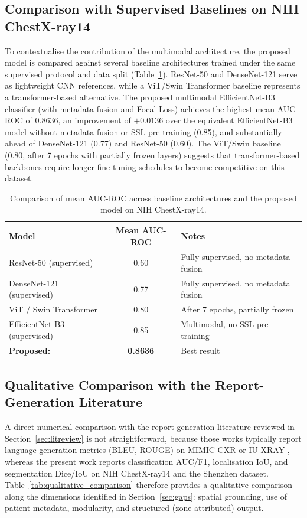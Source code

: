 \documentclass[preprint,12pt,authoryear]{elsarticle}
\begin{document}
\subsection{Comparison with Supervised Baselines on NIH ChestX-ray14}

To contextualise the contribution of the multimodal architecture, the proposed model is compared against several baseline architectures trained under the same supervised protocol and data split (Table~\ref{tab:baselines}). ResNet-50 and DenseNet-121 serve as lightweight CNN references, while a ViT/Swin Transformer baseline represents a transformer-based alternative. The proposed multimodal EfficientNet-B3 classifier (with metadata fusion and Focal Loss) achieves the highest mean AUC-ROC of 0.8636, an improvement of $+0.0136$ over the equivalent EfficientNet-B3 model without metadata fusion or SSL pre-training (0.85), and substantially ahead of DenseNet-121 (0.77) and ResNet-50 (0.60). The ViT/Swin baseline (0.80, after 7 epochs with partially frozen layers) suggests that transformer-based backbones require longer fine-tuning schedules to become competitive on this dataset.
\FloatBarrier
\begin{table}[ht]
\centering
\caption{Comparison of mean AUC-ROC across baseline architectures and the proposed model on NIH ChestX-ray14.}
\label{tab:baselines}
\renewcommand{\arraystretch}{1.3}
\begin{tabular}{lcl}
\toprule
\textbf{Model} & \textbf{Mean AUC-ROC} & \textbf{Notes} \\
\midrule
ResNet-50 (supervised)        & 0.60 & Fully supervised, no metadata fusion \\
DenseNet-121 (supervised)     & 0.77 & Fully supervised, no metadata fusion \\
ViT / Swin Transformer        & 0.80 & After 7 epochs, partially frozen \\
EfficientNet-B3 (supervised)  & 0.85 & Multimodal, no SSL pre-training \\
\rowcolor{gray!15}
\textbf{Proposed:} & \textbf{0.8636} & Best result \\
\bottomrule
\end{tabular}
\end{table}
\FloatBarrier
\subsection{Qualitative Comparison with the Report-Generation Literature}

A direct numerical comparison with the report-generation literature reviewed in Section~\ref{sec:litreview} is not straightforward, because those works typically report language-generation metrics (BLEU, ROUGE) on MIMIC-CXR or IU-XRAY \citep{yang_knowledge,mmg_fusion}, whereas the present work reports classification AUC/F1, localisation IoU, and segmentation Dice/IoU on NIH ChestX-ray14 and the Shenzhen dataset. Table~\ref{tab:qualitative_comparison} therefore provides a qualitative comparison along the dimensions identified in Section~\ref{sec:gaps}: spatial grounding, use of patient metadata, modularity, and structured (zone-attributed) output.
\end{document}
